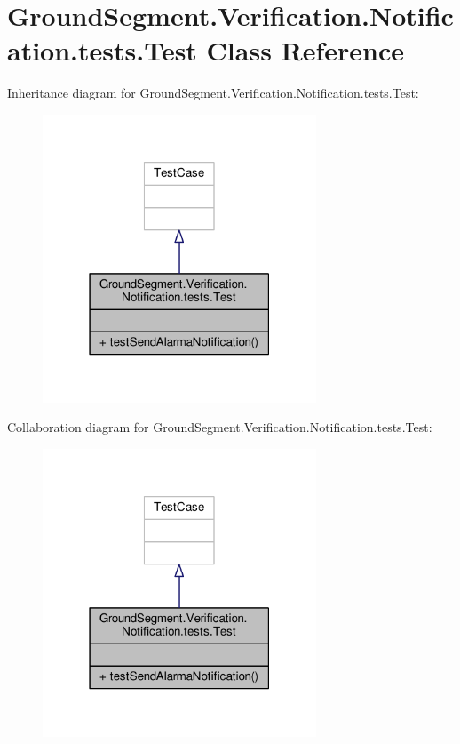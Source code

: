 \hypertarget{class_ground_segment_1_1_verification_1_1_notification_1_1tests_1_1_test}{}\section{Ground\+Segment.\+Verification.\+Notification.\+tests.\+Test Class Reference}
\label{class_ground_segment_1_1_verification_1_1_notification_1_1tests_1_1_test}


Inheritance diagram for Ground\+Segment.\+Verification.\+Notification.\+tests.\+Test\+:\nopagebreak
\begin{figure}[H]
\begin{center}
\leavevmode
\includegraphics[width=231pt]{class_ground_segment_1_1_verification_1_1_notification_1_1tests_1_1_test__inherit__graph}
\end{center}
\end{figure}


Collaboration diagram for Ground\+Segment.\+Verification.\+Notification.\+tests.\+Test\+:\nopagebreak
\begin{figure}[H]
\begin{center}
\leavevmode
\includegraphics[width=231pt]{class_ground_segment_1_1_verification_1_1_notification_1_1tests_1_1_test__coll__graph}
\end{center}
\end{figure}
